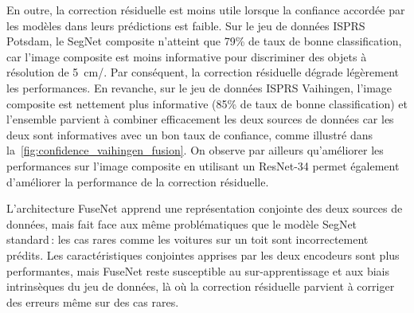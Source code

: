 En outre, la correction résiduelle est moins utile lorsque la confiance accordée par les modèles dans leurs prédictions est faible. Sur le jeu de données ISPRS Potsdam, le SegNet composite n'atteint que 79\% de taux de bonne classification, car l'image composite est moins informative pour discriminer des objets à résolution de \SI{5}{\centi\meter/\px}. Par conséquent, la correction résiduelle dégrade légèrement les performances. En revanche, sur le jeu de données ISPRS Vaihingen, l'image composite est nettement plus informative (85\% de taux de bonne classification) et l'ensemble parvient à combiner efficacement les deux sources de données car les deux sont informatives avec un bon taux de confiance, comme illustré dans la~\cref{fig:confidence_vaihingen_fusion}. On observe par ailleurs qu'améliorer les performances sur l'image composite en utilisant un ResNet-34 permet également d'améliorer la performance de la correction résiduelle.

L'architecture FuseNet apprend une représentation conjointe des deux sources de données, mais fait face aux même problématiques que le modèle SegNet standard\,: les cas rares comme les voitures sur un toit sont incorrectement prédits. Les caractéristiques conjointes apprises par les deux encodeurs sont plus performantes, mais FuseNet reste susceptible au sur-apprentissage et aux biais intrinsèques du jeu de données, là où la correction résiduelle parvient à corriger des erreurs même sur des cas rares.

